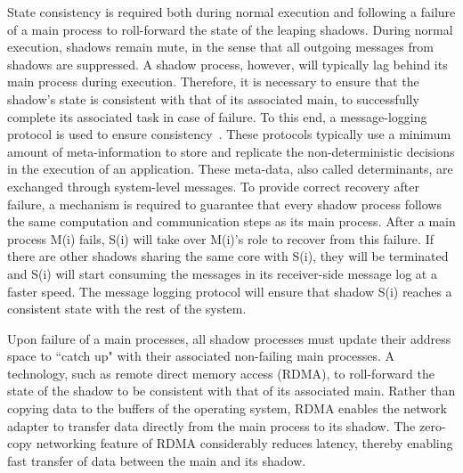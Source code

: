 %



State consistency is required both during normal execution and following a failure of a main process to roll-forward the state of the leaping shadows. During normal execution, shadows remain mute, in the sense that 
all outgoing messages from shadows are suppressed. 
A shadow process, however, will typically lag behind its main process during execution. Therefore, it is necessary to ensure that the shadow's state is consistent with that of its associated main, to successfully complete its associated task in case of failure. To this end, a message-logging protocol is used to ensure consistency~\cite{Marz}. These protocols typically use a minimum amount of meta-information to store and replicate the non-deterministic decisions in the execution of an application.  These meta-data, also called determinants, are exchanged through system-level messages. To provide correct recovery after failure, 
a mechanism is required to guarantee that every shadow process follows the same computation and communication steps as its main process. 
After a main process M(i) fails, S(i) will take over M(i)'s role to recover from this failure. If there are other shadows sharing the same core with S(i), they will be terminated and S(i) will start consuming the messages in its receiver-side message log at a faster speed. The message logging protocol will ensure that shadow S(i) reaches a consistent state with the rest of the system. 

Upon failure of a main processes, all shadow processes must update their address space to ``catch up" with their associated non-failing main processes. A technology, such as remote direct memory access (RDMA), to roll-forward the state of the shadow to be consistent with that of its associated main. Rather than copying data to the buffers of the operating system, RDMA enables the network adapter to transfer data directly from the main process to its shadow. The zero-copy networking feature of RDMA considerably reduces latency, thereby enabling fast transfer of data between the main and its shadow.

 


